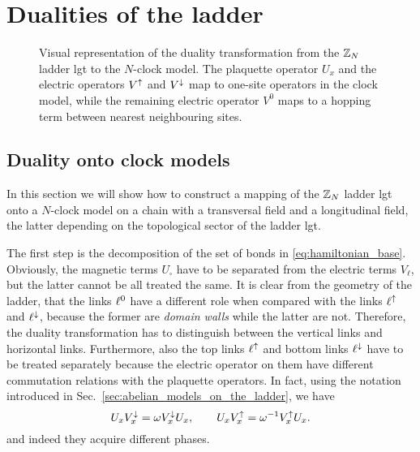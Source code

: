 \section{Dualities of the ladder}%
\label{sec:dualities_of_the_ladder}




\begin{figure}[t]
    \centering
    
    \caption[Duality map of $\Z_N$ ladder \ac{lgt}]{Visual representation of the duality transformation from the $\Z_N$ ladder \ac{lgt} to the $N$-clock model.
    The plaquette operator $U_x$ and the electric operators $V^{\uparrow}$ and $V^{\downarrow}$ map to one-site operators in the clock model, while
    the remaining electric operator $V^0$ maps to a hopping term between nearest neighbouring sites.}
    \label{fig:ladder_duality}
\end{figure}

\subsection{Duality onto clock models}
\label{sub:duality_onto_clock_models}

In this section we will show how to construct a mapping of the $\Z_N$ ladder \ac{lgt} onto a $N$-clock model on a chain with a transversal field and a longitudinal field, the latter depending on the topological sector of the ladder \ac{lgt}.

The first step is the decomposition of the set of bonds in \eqref{eq:hamiltonian_base}.
Obviously, the magnetic terms $U_{\square}$ have to be separated from the electric terms $V_\ell$, but the latter cannot be all treated the same.
It is clear from the geometry of the ladder, that the links $\ell^0$ have a different role when compared with the links $\ell^\uparrow$ and $\ell^\downarrow$, because the former are \emph{domain walls} while the latter are not.
Therefore, the duality transformation has to distinguish between the vertical links and horizontal links.
Furthermore, also the top links $\ell^\uparrow$ and bottom links $\ell^\downarrow$ have to be treated separately because the electric operator on them have different commutation relations with the plaquette operators.
In fact, using the notation introduced in Sec.~\ref{sec:abelian_models_on_the_ladder}, we have
\begin{equation}
    U_x V^{\downarrow}_x = \omega V^{\downarrow}_x U_x, \qquad
    U_x V^{\uparrow}_x = \omega^{-1} V^{\uparrow}_x U_x.
    \label{eq:comm_rel_ladder}
\end{equation}
and indeed they acquire different phases.

